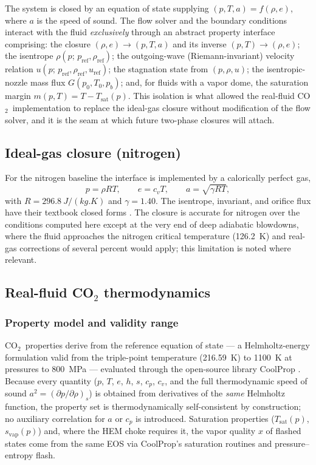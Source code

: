 \documentclass[11pt]{article}
\newcommand{\co}{CO$_2$}
\begin{document}
The system is closed by an equation of state supplying
$(p, T, a) = f(\rho, e)$, where $a$ is the speed of sound. The flow
solver and the boundary conditions interact with the fluid
\emph{exclusively} through an abstract property interface comprising:
the closure $(\rho,e)\to(p,T,a)$ and its inverse $(p,T)\to(\rho,e)$;
the isentrope $\rho(p;\,p_{\mathrm{ref}},\rho_{\mathrm{ref}})$; the
outgoing-wave (Riemann-invariant) velocity relation
$u(p;\,p_{\mathrm{ref}},\rho_{\mathrm{ref}},u_{\mathrm{ref}})$; the
stagnation state from $(p,\rho,u)$; the isentropic-nozzle mass flux
$G(p_0,T_0,p_b)$; and, for fluids with a vapor dome, the saturation
margin $m(p,T) = T - T_{\mathrm{sat}}(p)$. This isolation is what
allowed the real-fluid \co\ implementation to replace the ideal-gas
closure without modification of the flow solver, and it is the seam at
which future two-phase closures will attach.

\subsection{Ideal-gas closure (nitrogen)}
\label{sec:ideal}

For the nitrogen baseline the interface is implemented by a calorically
perfect gas,
\begin{equation}
p = \rho R T, \qquad e = c_v T, \qquad a = \sqrt{\gamma R T},
\end{equation}
with $R=\SI{296.8}{J/(kg.K)}$ and $\gamma=1.40$. The isentrope,
invariant, and orifice flux have their textbook closed forms
\citep{anderson1982}. The closure is accurate for nitrogen over the
conditions computed here except at the very end of deep adiabatic
blowdowns, where the fluid approaches the nitrogen critical temperature
(\SI{126.2}{K}) and real-gas corrections of several percent would
apply; this limitation is noted where relevant.

\subsection{Real-fluid CO$_2$ thermodynamics}
\label{sec:co2}

\subsubsection{Property model and validity range}

\co\ properties derive from the \citet{span1996} reference equation of
state --- a Helmholtz-energy formulation valid from the triple-point
temperature (\SI{216.59}{K}) to \SI{1100}{K} at pressures to
\SI{800}{MPa} --- evaluated through the open-source library CoolProp
\citep[version 8.0]{bell2014}. Because every quantity ($p$, $T$, $e$,
$h$, $s$, $c_p$, $c_v$, and the full thermodynamic speed of sound
$a^2 = (\partial p/\partial\rho)_s$) is obtained from derivatives of
the \emph{same} Helmholtz function, the property set is thermodynamically
self-consistent by construction; no auxiliary correlation for $a$ or
$c_p$ is introduced. Saturation properties
($T_{\mathrm{sat}}(p)$, $s_{\mathrm{vap}}(p)$) and, where the HEM choke
requires it, the vapor quality $x$ of flashed states come from the same
EOS via CoolProp's saturation routines and
pressure--entropy flash.
\end{document}
